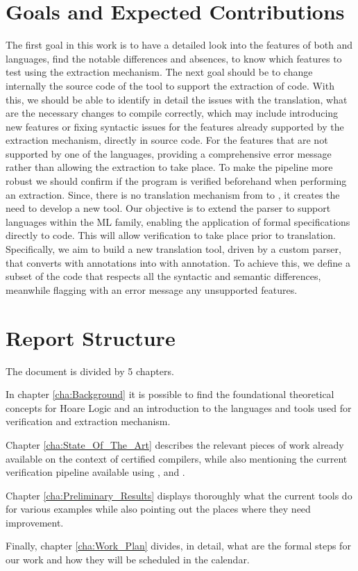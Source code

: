 \section{Goals and Expected Contributions}
\label{sec:Goals_and_Expected_Contributions}

The first goal in this work is to have a detailed look into the features of both \ocaml and \cml languages, find the notable 
differences and absences, to know which features to test using the extraction mechanism. The next goal should be to change 
internally the source code of the \cameleer tool to support the extraction of \cml code. With this, we should be able to identify
in detail the issues with the translation, what are the necessary changes to compile correctly, which may include introducing new features
or fixing syntactic issues for the features already supported by the extraction mechanism, directly in \whythree source code.
For the features that are not supported by one of the languages, providing a comprehensive error message rather than allowing 
the extraction to take place. To make the pipeline more robust we should confirm if the program is verified beforehand when performing 
an extraction. Since, there is no translation mechanism from \cml to \ocaml, it creates the need to develop a new tool. Our objective is 
to extend the \gospel parser to support languages within the ML family, enabling the application of formal specifications directly to 
\cml code. This will allow verification to take place prior to translation. Specifically, we aim to build a new translation tool, 
driven by a custom parser, that converts \cml with \gospel annotations into \ocaml with \gospel annotation. To achieve this, we define
a subset of the \cml code that respects all the syntactic and semantic differences, meanwhile flagging with an error message any 
unsupported features.

\section{Report Structure}
\label{sec:Report_Structure}

The document is divided by 5 chapters. 

In chapter \ref{cha:Background} it is possible to find the foundational theoretical concepts for Hoare Logic and an introduction to 
the languages and tools used for verification and extraction mechanism.

Chapter \ref{cha:State_Of_The_Art} describes the relevant pieces of work already available on the context of certified compilers, 
while also mentioning the current verification pipeline available using \cameleer, \whythree and \cml. 

Chapter \ref{cha:Preliminary_Results} displays thoroughly what the current tools do for various examples while also pointing out the 
places where they need improvement. 

Finally, chapter \ref{cha:Work_Plan} divides, in detail, what are the formal steps for our work and how they will be scheduled in 
the calendar.